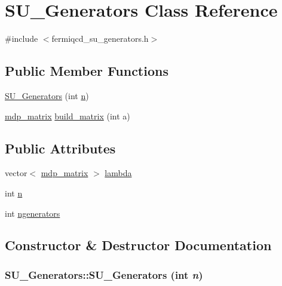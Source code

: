 \hypertarget{class_s_u___generators}{
\section{SU\_\-Generators Class Reference}
\label{class_s_u___generators}
}


{\ttfamily \#include $<$fermiqcd\_\-su\_\-generators.h$>$}\subsection*{Public Member Functions}
\begin{DoxyCompactItemize}
\item 
\hyperlink{class_s_u___generators_a046ea4e0e0a22d86568eb8012cf0032b}{SU\_\-Generators} (int \hyperlink{class_s_u___generators_a02ad86d7679e2e64a7177d6caecb12fd}{n})
\item 
\hyperlink{classmdp__matrix}{mdp\_\-matrix} \hyperlink{class_s_u___generators_aba3244f13bc625fabd171cce694f3e9b}{build\_\-matrix} (int a)
\end{DoxyCompactItemize}
\subsection*{Public Attributes}
\begin{DoxyCompactItemize}
\item 
vector$<$ \hyperlink{classmdp__matrix}{mdp\_\-matrix} $>$ \hyperlink{class_s_u___generators_a15ed0103ec40c52a54b3900516ed713f}{lambda}
\item 
int \hyperlink{class_s_u___generators_a02ad86d7679e2e64a7177d6caecb12fd}{n}
\item 
int \hyperlink{class_s_u___generators_a0ad4b16aa28e9eabeb738634efa1fa23}{ngenerators}
\end{DoxyCompactItemize}


\subsection{Constructor \& Destructor Documentation}
\hypertarget{class_s_u___generators_a046ea4e0e0a22d86568eb8012cf0032b}{
\subsubsection[{SU\_\-Generators}]{\setlength{\rightskip}{0pt plus 5cm}SU\_\-Generators::SU\_\-Generators (int {\em n})}}
\label{class_s_u___generators_a046ea4e0e0a22d86568eb8012cf0032b}


